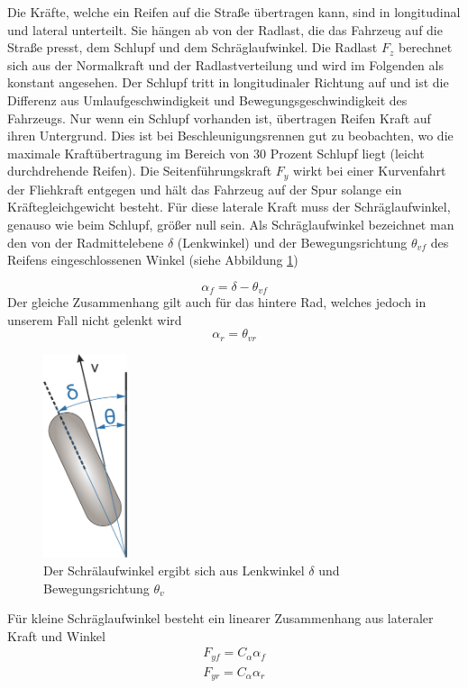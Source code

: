 \documentclass{like}
\begin{document}
Die Kräfte, welche ein Reifen auf die Straße übertragen kann, sind in longitudinal und lateral unterteilt. Sie hängen ab von der Radlast, die das Fahrzeug auf die Straße presst, dem Schlupf und dem Schräglaufwinkel. Die Radlast \(F_z\) berechnet sich aus der Normalkraft und der Radlastverteilung und wird im Folgenden als konstant angesehen. Der Schlupf tritt in longitudinaler Richtung auf und ist die Differenz aus Umlaufgeschwindigkeit und Bewegungsgeschwindigkeit des Fahrzeugs.
Nur wenn ein Schlupf vorhanden ist, übertragen Reifen Kraft auf ihren Untergrund. Dies ist bei Beschleunigungsrennen gut zu beobachten, wo die maximale Kraftübertragung im Bereich von 30 Prozent Schlupf liegt (leicht durchdrehende Reifen).
Die Seitenführungskraft \(F_y\) wirkt bei einer Kurvenfahrt der Fliehkraft entgegen und hält das Fahrzeug auf der Spur solange ein Kräftegleichgewicht besteht. Für diese laterale Kraft muss der Schräglaufwinkel, genauso wie beim Schlupf, größer null sein. Als Schräglaufwinkel bezeichnet man den von der Radmittelebene \(\delta\) (Lenkwinkel) und der Bewegungsrichtung \(\theta_{vf}\) des Reifens eingeschlossenen Winkel (siehe Abbildung \ref{fig:linLat})

\begin{equation}
\alpha_f = \delta - \theta_{vf}
\end{equation}
Der gleiche Zusammenhang gilt auch für das hintere Rad, welches jedoch in unserem Fall nicht gelenkt wird
\begin{equation}
\alpha_r = \theta_{vr}
\end{equation}


\begin{figure}[ht!]
	\centering
	\includegraphics[width=70pt]{Abbildungen/slipAngle.png}
	\caption{Der Schrälaufwinkel ergibt sich aus Lenkwinkel \(\delta\) und Bewegungsrichtung \(\theta_{v}\)}
	\label{fig:linLat}
\end{figure}


Für kleine Schräglaufwinkel besteht ein linearer Zusammenhang aus lateraler Kraft und Winkel
\begin{eqnarray}
F_{yf} = C_\alpha \alpha_f \\
F_{yr} = C_\alpha \alpha_r
\end{eqnarray}
\end{document}
